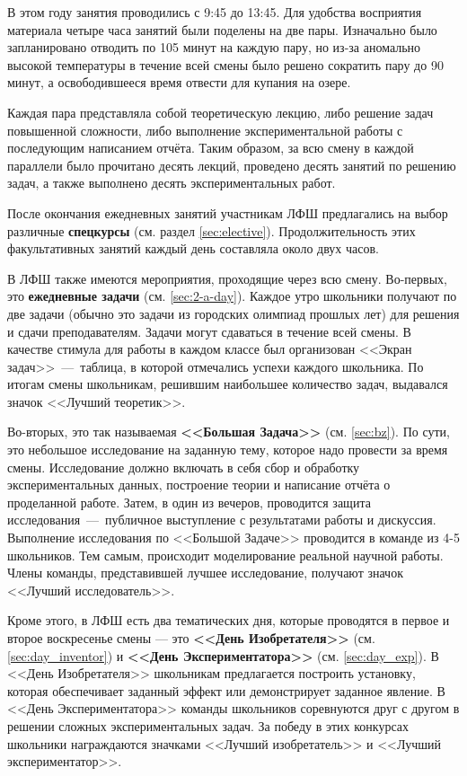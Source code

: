 \documentclass[12pt,a4paper,oneside,draft]{scrartcl}
\newlength{\h}
\newlength{\x}
\begin{document}
В этом году занятия проводились с 9:45 до 13:45. Для удобства
восприятия материала четыре часа занятий были поделены на две
пары. Изначально было запланировано отводить по 105 минут на каждую
пару, но из-за аномально высокой температуры в течение всей смены было
решено сократить пару до 90 минут, а освободившееся время отвести для
купания на озере.

Каждая пара представляла собой теоретическую лекцию, либо решение
задач повышенной сложности, либо выполнение экспериментальной работы с
последующим написанием отчёта. Таким образом, за всю смену в каждой
параллели было прочитано десять лекций, проведено десять занятий по
решению задач, а также выполнено десять экспериментальных работ.

После окончания ежедневных занятий участникам ЛФШ предлагались на
выбор различные \textbf{спецкурсы} (см. раздел
\ref{sec:elective}). Продолжительность этих факультативных занятий
каждый день составляла около двух часов. 

В ЛФШ также имеются мероприятия, проходящие через всю
смену. Во-первых, это \textbf{ежедневные задачи}
(см. \ref{sec:2-a-day}). Каждое утро школьники получают по две задачи
(обычно это задачи из городских олимпиад прошлых лет) для решения и
сдачи преподавателям. Задачи могут сдаваться в течение всей смены. В
качестве стимула для работы в каждом классе был организован <<Экран
задач>>~---~таблица, в которой отмечались успехи каждого школьника. По
итогам смены школьникам, решившим наибольшее количество задач,
выдавался значок <<Лучший теоретик>>.

Во-вторых, это так называемая \textbf{<<Большая Задача>>}
(см. \ref{sec:bz}). По сути, это небольшое исследование на заданную
тему, которое надо провести за время смены. Исследование должно
включать в себя сбор и обработку экспериментальных данных, построение
теории и написание отчёта о проделанной работе. Затем, в один из
вечеров, проводится защита исследования~---~публичное выступление с
результатами работы и дискуссия. Выполнение исследования по <<Большой
Задаче>> проводится в команде из 4-5 школьников. Тем самым, происходит
моделирование реальной научной работы. Члены команды, представившей
лучшее исследование, получают значок <<Лучший исследователь>>.

Кроме этого, в ЛФШ есть два тематических дня, которые проводятся в
первое и второе воскресенье смены --- это \textbf{<<День Изобретателя>>}
(см. \ref{sec:day_inventor}) и \textbf{<<День Экспериментатора>>}
(см. \ref{sec:day_exp}). В <<День Изобретателя>> школьникам
предлагается построить установку, которая обеспечивает заданный эффект
или демонстрирует заданное явление. В <<День Экспериментатора>>
команды школьников соревнуются друг с другом в решении сложных
экспериментальных задач. За победу в этих конкурсах школьники
награждаются значками <<Лучший изобретатель>> и <<Лучший
экспериментатор>>.
\end{document}

